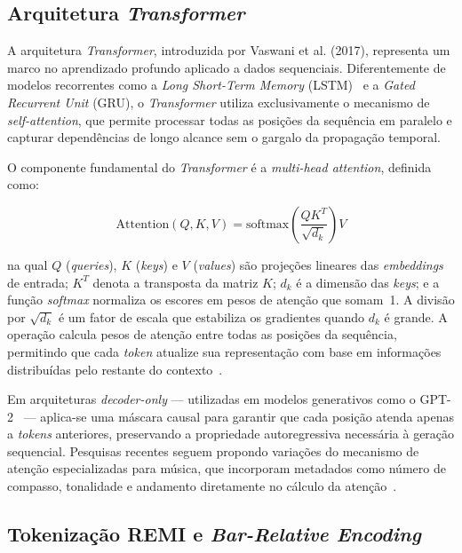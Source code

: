 \documentclass[12pt]{article}
\begin{document}
\subsection{Arquitetura \emph{Transformer}}

A arquitetura \emph{Transformer}, introduzida por Vaswani et al. (2017),
representa um marco no aprendizado profundo aplicado a dados sequenciais.
Diferentemente de modelos recorrentes como a \emph{Long Short-Term Memory}
(LSTM)~\cite{hochreiter1997} e a \emph{Gated Recurrent Unit} (GRU), o
\emph{Transformer} utiliza exclusivamente o mecanismo de \emph{self-attention},
que permite processar todas as posições da sequência em paralelo e capturar
dependências de longo alcance sem o gargalo da propagação temporal.

O componente fundamental do \emph{Transformer} é a \emph{multi-head attention},
definida como:

\begin{equation}
  \mathrm{Attention}(Q, K, V) =
  \mathrm{softmax}\!\left(\frac{Q K^{T}}{\sqrt{d_k}}\right) V
\end{equation}

\noindent na qual $Q$ (\emph{queries}), $K$ (\emph{keys}) e $V$ (\emph{values})
são projeções lineares das \emph{embeddings} de entrada; $K^{T}$ denota a
transposta da matriz $K$; $d_k$ é a dimensão das \emph{keys}; e a função
\emph{softmax} normaliza os escores em pesos de atenção que somam~1. A divisão por
$\sqrt{d_k}$ é um fator de escala que estabiliza os gradientes quando $d_k$ é
grande. A operação calcula pesos de atenção entre todas as posições da sequência,
permitindo que cada \emph{token} atualize sua representação com base em
informações distribuídas pelo restante do contexto~\cite{vaswani2017}.

Em arquiteturas \emph{decoder-only} --- utilizadas em modelos generativos como o
GPT-2~\cite{radford2019} --- aplica-se uma máscara causal para garantir que cada
posição atenda apenas a \emph{tokens} anteriores, preservando a propriedade
autoregressiva necessária à geração sequencial. Pesquisas recentes seguem
propondo variações do mecanismo de atenção especializadas para música, que
incorporam metadados como número de compasso, tonalidade e andamento diretamente
no cálculo da atenção~\cite{taksuka2026}.

\subsection{Tokenização REMI e \emph{Bar-Relative Encoding}}
\end{document}
